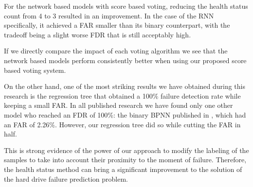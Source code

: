 For the network based models with score based voting, reducing the health status count from 4 to 3 resulted in an improvement.
In the case of the RNN specifically, it achieved a FAR smaller than its binary counterpart, with the tradeoff being a slight worse FDR that is still acceptably high.

If we directly compare the impact of each voting algorithm we see that the network based models perform consistently better when using our proposed score based voting system.

On the other hand, one of the most striking results we have obtained during this research is the regression tree that obtained a 100\% failure detection rate while keeping a small FAR.
In all published research we have found only one other model who reached an FDR of 100\%: the binary BPNN published in \cite{Zhu13}, which had an FAR of 2.26\%.
However, our regression tree did so while cutting the FAR in half.

This is strong evidence of the power of our approach to modify the labeling of the samples to take into account their proximity to the moment of failure.
Therefore, the health status method can bring a significant improvement to the solution of the hard drive failure prediction problem.